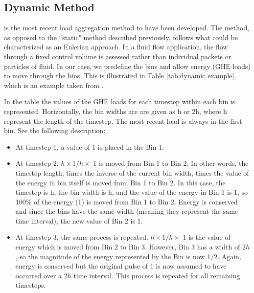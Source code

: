 \documentclass[review,12pt]{elsarticle}
\begin{document}
\subsection*{Dynamic Method}

\cite{ClaessonJaved2012} is the most recent load aggregation method to have been developed. The method, as opposed to the ``static" method described previously, follows what could be characterized as an Eulerian approach. In a fluid flow application, the flow through a fixed control volume is assessed rather than individual packets or particles of fluid. In our case, we predefine the bins and allow energy (GHE loads) to move through the bins.  This is illustrated in Table \ref{tab:dynamic example}, which is an example taken from \cite{ClaessonJaved2012}. 

In the table the values of the GHE loads for each timestep within each bin is represented. Horizontally, the bin widths are are given as h or 2h, where h represent the length of the timestep. The most recent load is always in the first bin. See the following description:

\begin{itemize}
    \item At timestep 1, a value of 1 is placed in the Bin 1. 
    
    \item At timestep 2, $h \times 1/h \times$ 1 is moved from Bin 1 to Bin 2. In other words, the timestep length, times the inverse of the current bin width, times the value of the energy in bin itself is moved from Bin 1 to Bin 2. In this case, the timestep is h, the bin width is h, and the value of the energy in Bin 1 is 1, so 100\% of the energy (1) is moved from Bin 1 to Bin 2.  Energy is conserved and since the bins have the same width (meaning they represent the same time interval), the new value of Bin 2 is 1.
    
    \item At timestep 3, the same process is repeated. $h \times 1/h \times$ 1 is the value of energy which is moved from Bin 2 to Bin 3. However, Bin 3 has a width of $2h$, so the magnitude of the energy represented by the Bin is now 1/2. Again, energy is conserved but the original pulse of 1 is now assumed to have occurred over a $2h$ time interval. This process is repeated for all remaining timesteps.

\end{itemize}
\end{document}
